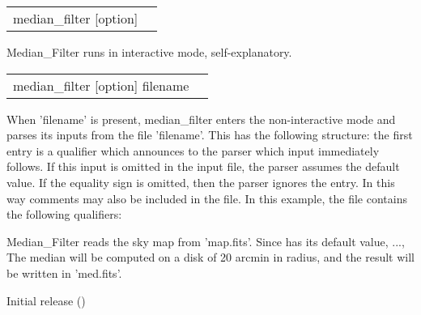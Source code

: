 \begin{examples}{1}
{
\begin{tabular}{ll} %
median\_filter  [option] \\
\end{tabular}
}
{
Median\_Filter runs in interactive mode, self-explanatory.
}
\end{examples}


\begin{examples}{2}
{
\begin{tabular}{ll} %
median\_filter  [option] filename \\
\end{tabular}
}
{When 'filename' is present, median\_filter enters the non-interactive mode and parses
its inputs from the file 'filename'. This has the following
structure: the first entry is a qualifier which announces to the parser
which input immediately follows. If this input is omitted in the
input file, the parser assumes the default value.
If the equality sign is omitted, then the parser ignores the entry.
In this way comments may also be included in the file.
In this example, the file contains the following qualifiers:\hfill\newline
{}

Median\_Filter reads the sky map from 'map.fits'. Since \hfill\newline
{}
has its default value, ..., The median will be computed on a disk of 20 arcmin
in radius, and the result will be written in 'med.fits'.
}
\end{examples}

\begin{release}
  \begin{relist}
    \item Initial release ()
  \end{relist}
\end{release}

